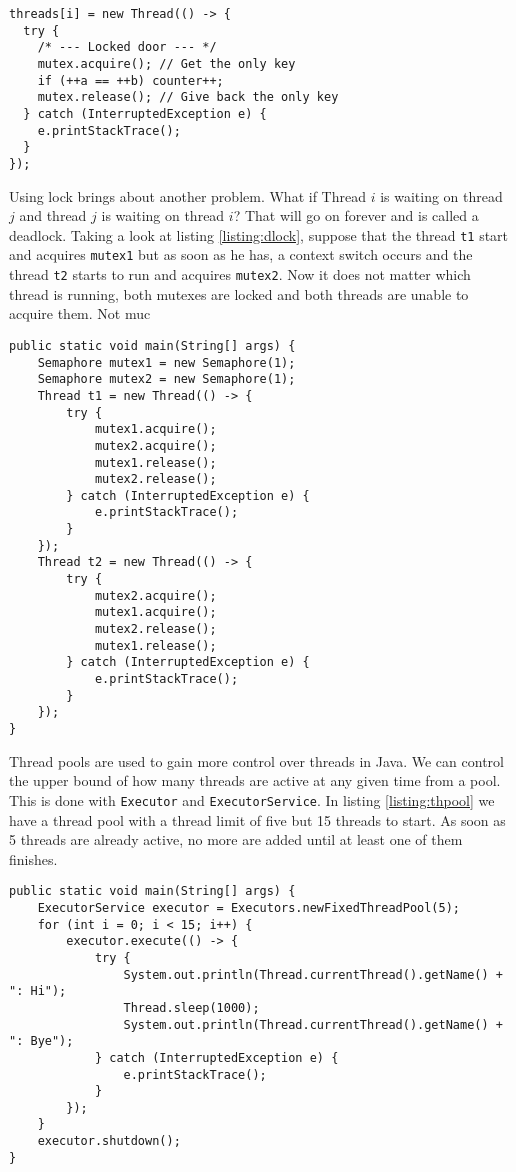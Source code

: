 \begin{lstlisting}[style=A_Java]
threads[i] = new Thread(() -> {
  try {
    /* --- Locked door --- */
    mutex.acquire(); // Get the only key
    if (++a == ++b) counter++;
    mutex.release(); // Give back the only key
  } catch (InterruptedException e) {
    e.printStackTrace();
  }
});
\end{lstlisting}

Using lock brings about another problem. What if Thread $i$ is waiting on thread $j$ and thread $j$ is waiting on thread $i$? That will go on forever and is called a deadlock. Taking a look at listing \ref{listing:dlock}, suppose that the thread \texttt{t1} start and acquires \texttt{mutex1} but as soon as he has, a context switch occurs and the thread \texttt{t2} starts to run and acquires \texttt{mutex2}. Now it does not matter which thread is running, both mutexes are locked and both threads are unable to acquire them. Not muc

\begin{lstlisting}[style=A_Java, caption={Deadlock}, label={listing:dlock}]
public static void main(String[] args) {
    Semaphore mutex1 = new Semaphore(1);
    Semaphore mutex2 = new Semaphore(1);
    Thread t1 = new Thread(() -> {
        try {
            mutex1.acquire();
            mutex2.acquire();
            mutex1.release();
            mutex2.release();
        } catch (InterruptedException e) {
            e.printStackTrace();
        }
    });
    Thread t2 = new Thread(() -> {
        try {
            mutex2.acquire();
            mutex1.acquire();
            mutex2.release();
            mutex1.release();
        } catch (InterruptedException e) {
            e.printStackTrace();
        }
    });
}
\end{lstlisting}

Thread pools are used to gain more control over threads in Java. We can control the upper bound of how many threads are active at any given time from a pool. This is done with \texttt{Executor} and \texttt{ExecutorService}. In listing \ref{listing:thpool} we have a thread pool with a thread limit of five but 15 threads to start. As soon as 5 threads are already active, no more are added until at least one of them finishes.

\begin{lstlisting}[style=A_Java, caption={Thread pool}, label={listing:thpool}]
public static void main(String[] args) {
    ExecutorService executor = Executors.newFixedThreadPool(5);
    for (int i = 0; i < 15; i++) {
        executor.execute(() -> {
            try {
                System.out.println(Thread.currentThread().getName() + ": Hi");
                Thread.sleep(1000);
                System.out.println(Thread.currentThread().getName() + ": Bye");
            } catch (InterruptedException e) {
                e.printStackTrace();
            }
        });
    }
    executor.shutdown();
}
\end{lstlisting}

